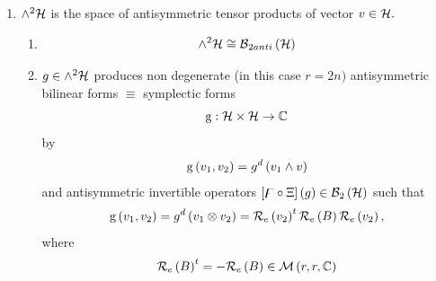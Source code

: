 \begin{enumerate}
\begin{enumerate}
\begin{enumerate}
\item right non degeneracy means 
\begin{equation}
{\rm b}\left( v_{1},v_{2}\right) =0\,\forall v_{1}\Leftrightarrow v_{2}=0
\end{equation}
\end{enumerate}

\item The invariance group $GL_{{\rm b}}\left( {\cal H}\right) $ of ${\rm b}$
is defined as 
\begin{equation}
\left\{ \left. T\in GL\left( {\cal H}\right) \right\vert {\rm b}\left(
Tv_{1},Tv_{2}\right) ={\rm b}\left( v_{1},v_{2}\right) \forall
v_{1},v_{2}\in {\cal H}\right\}
\end{equation}
\end{enumerate}

\item ${\LARGE \wedge }^{2}{\cal H}$ is the space of antisymmetric tensor
products of vector $v\in {\cal H}.$

\begin{enumerate}
\item 
\begin{equation}
{\LARGE \wedge }^{2}{\cal H\cong B}_{2anti}\left( {\cal H}\right)
\end{equation}

\item $g\in {\LARGE \wedge }^{2}{\cal H}$ produces non degenerate (in this
case $r=2n)$ antisymmetric bilinear forms $\equiv $ symplectic forms 
\begin{equation}
{\rm g}:{\cal H\times H}\rightarrow {\Bbb C}
\end{equation}%
by 
\begin{equation}
{\rm g}\left( v_{1},v_{2}\right) =g^{d}\left( v_{1}\wedge v\right)
\end{equation}%
and antisymmetric invertible operators $\left[ \digamma \circ \Xi \right]
\left( g\right) \in {\cal B}_{2}\left( {\cal H}\right) $ such that 
\begin{equation}
{\rm g}\left( v_{1},v_{2}\right) =g^{d}\left( v_{1}\otimes v_{2}\right) =%
{\cal R}_{e}\left( v_{2}\right) ^{t}{\cal R}_{e}\left( B\right) {\cal R}%
_{e}\left( v_{2}\right) ,
\end{equation}%
where 
\begin{equation}
{\cal R}_{e}\left( B\right) ^{t}=-{\cal R}_{e}\left( B\right) \in {\cal M}%
\left( r,r,{\Bbb C}\right)
\end{equation}


\end{enumerate}
\end{enumerate}
